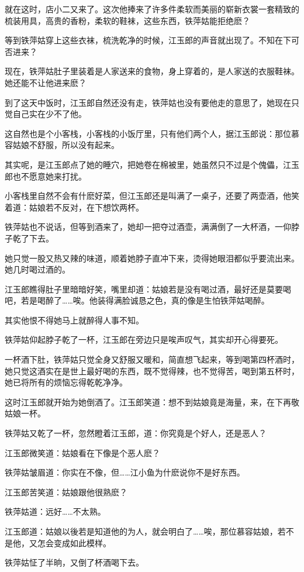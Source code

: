 \documentclass[12pt,oneside]{book}
\begin{document}
就在这时，店小二又来了。这次他捧来了许多件柔软而美丽的崭新衣裳一套精致的梳装用具，高贵的香粉，柔软的鞋袜，这些东西，铁萍姑能拒绝麽？

等到铁萍姑穿上这些衣袜，梳洗乾净的时候，江玉郎的声音就出现了。不知在下可否进来？

现在，铁萍姑肚子里装着是人家送来的食物，身上穿着的，是人家送的衣服鞋袜。她还能不让他进来麽？

到了这天中饭时，江玉郎自然还没有走，铁萍姑也没有要他走的意思了，她现在只觉自己实在少不了他。

这自然也是个小客栈，小客栈的小饭厅里，只有他们两个人，据江玉郎说：那位慕容姑娘不舒服，所以没有起来。

其实呢，是江玉郎点了她的睡穴，把她卷在棉被里，她虽然只不过是个傀儡，江玉郎也不愿意她来打扰。

小客栈里自然不会有什麽好菜，但江玉郎还是叫满了一桌子，还要了两壶酒，他笑着道：姑娘若不反对，在下想饮两杯。

铁萍姑也不说话，但等到酒来了，她却一把夺过酒壶，满满倒了一大杯酒，一仰脖子乾了下去。

她只觉一股又热又辣的味道，顺着她脖子直冲下来，烫得她眼泪都似乎要流出来。她几时喝过酒的。

江玉郎瞧得肚子里暗暗好笑，嘴里却道：姑娘若是没有喝过酒，最好还是莫要喝吧，若是喝醉了\ldots\ldots 唉。他装得满脸诚恳之色，真的像是生怕铁萍姑喝醉。

其实他恨不得她马上就醉得人事不知。

铁萍姑仰起脖子乾了一杯，江玉郎在旁边只是唉声叹气，其实却开心得要死。

一杯酒下肚，铁萍姑只觉全身又舒服又暖和，简直想飞起来，等到喝第四杯酒时，她只觉这酒实在是世上最好喝的东西，既不觉得辣，也不觉得苦，喝到第五杯时，她已将所有的烦恼忘得乾乾净净。

这时江玉郎就开始为她倒酒了。江玉郎笑道：想不到姑娘竟是海量，来，在下再敬姑娘一杯。

铁萍姑又乾了一杯，忽然瞪着江玉郎，道：你究竟是个好人，还是恶人？

江玉郎微笑道：姑娘看在下像是个恶人麽？

铁萍姑皱眉道：你实在不像，但\ldots\ldots 江小鱼为什麽说你不是好东西。

江玉郎苦笑道：姑娘跟他很熟麽？

铁萍姑道：远好\ldots\ldots 不太熟。

江玉郎道：姑娘以後若是知道他的为人，就会明白了\ldots\ldots 唉，那位慕容姑娘，若不是他，又怎会变成如此模样。

铁萍姑怔了半晌，又倒了杯酒喝下去。
\end{document}
